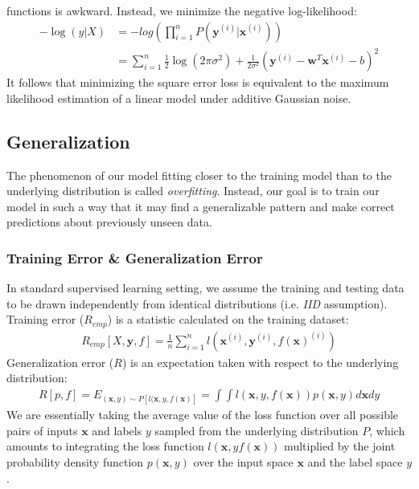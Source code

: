 \documentclass[a4paper,12pt]{article}
\theoremstyle{definition}
\begin{document}
functions is awkward. Instead, we minimize the negative log-likelihood:
\begin{equation*}
    \begin{aligned}
        -\log(y|X) & = -log(\prod_{i=1}^{n}P(\mathbf{y}^{(i)}|\mathbf{x}^{(i)}))                                                               \\
                   & = \sum_{i=1}^{n} \frac{1}{2}\log(2\pi\sigma^2) + \frac{1}{2\sigma^2}(\mathbf{y}^{(i)}-\mathbf{w}^T\mathbf{x}^{(i)} - b)^2
    \end{aligned}
\end{equation*}
It follows that minimizing the square error loss is equivalent to the maximum likelihood estimation of a linear model
under additive Gaussian noise.

\subsection*{Generalization}
The phenomenon of our model fitting closer to the training model than to the underlying distribution is called \textit{overfitting}.
Instead, our goal is to train our model in such a way that it may find a generalizable pattern and make correct
predictions about previously unseen data.
\subsubsection*{Training Error \& Generalization Error}
In standard supervised learning setting, we assume the training and testing data to be drawn independently from
identical distributions (i.e. \textit{IID} assumption).
Training error ($R_{emp}$) is a statistic calculated on the training dataset:
\begin{equation*}
    \begin{aligned}
        R_{emp}[X,\mathbf{y},f] = \frac{1}{n}\sum_{i=1}^{n}l(\mathbf{x}^{(i)},\mathbf{y}^{(i)},f(\mathbf{x})^{(i)})
    \end{aligned}
\end{equation*}
Generalization error ($R$) is an expectation taken with respect to the underlying distribution:
\begin{equation*}
    \begin{aligned}
        R[p,f] = E_{(\mathbf{x},y)\sim P[l(\mathbf{x},y,f(\mathbf{x})]} = \int\int l(\mathbf{x},y,f(\mathbf{x}))p(\mathbf{x},y)d\mathbf{x}dy
    \end{aligned}
\end{equation*}
We are essentially taking the average value of the loss function over all possible pairs of inputs $\mathbf{x}$ and labels $y$ sampled from
the underlying distribution $P$, which amounts to integrating the loss function $l(\mathbf{x}, y f(\mathbf{x}))$ multiplied by the joint probability
density function $p(\mathbf{x}, y)$ over the input space $\mathbf{x}$ and the label space $y$. 
\end{document}
